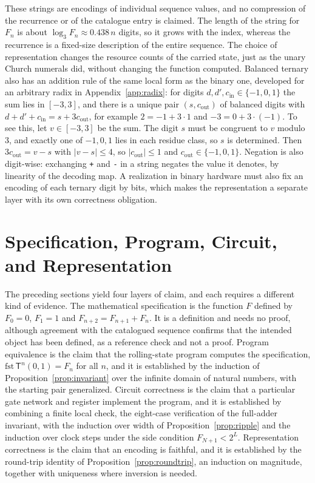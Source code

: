 \documentclass[11pt]{article}
\theoremstyle{definition}
\theoremstyle{remark}
\newcommand{\bt}[1]{\texttt{#1}}
\newcommand{\Tm}{\mathsf{T}}
\begin{document}
These strings are encodings of individual sequence values, and no compression of the recurrence or of the catalogue entry is claimed. The length of the string for $F_n$ is about $\log_3 F_n \approx 0.438\,n$ digits, so it grows with the index, whereas the recurrence is a fixed-size description of the entire sequence. The choice of representation changes the resource counts of the carried state, just as the unary Church numerals did, without changing the function computed. Balanced ternary also has an addition rule of the same local form as the binary one, developed for an arbitrary radix in Appendix~\ref{app:radix}: for digits $d, d', c_{\mathrm{in}} \in \{-1,0,1\}$ the sum lies in $[-3, 3]$, and there is a unique pair $(s, c_{\mathrm{out}})$ of balanced digits with $d + d' + c_{\mathrm{in}} = s + 3c_{\mathrm{out}}$, for example $2 = -1 + 3\cdot 1$ and $-3 = 0 + 3\cdot(-1)$. To see this, let $v \in [-3,3]$ be the sum. The digit $s$ must be congruent to $v$ modulo $3$, and exactly one of $-1, 0, 1$ lies in each residue class, so $s$ is determined. Then $3c_{\mathrm{out}} = v - s$ with $|v - s| \le 4$, so $|c_{\mathrm{out}}| \le 1$ and $c_{\mathrm{out}} \in \{-1, 0, 1\}$. Negation is also digit-wise: exchanging \bt{+} and \bt{-} in a string negates the value it denotes, by linearity of the decoding map. A realization in binary hardware must also fix an encoding of each ternary digit by bits, which makes the representation a separate layer with its own correctness obligation.

\section{Specification, Program, Circuit, and Representation}\label{sec:layers}

The preceding sections yield four layers of claim, and each requires a different kind of evidence. The mathematical specification is the function $F$ defined by $F_0 = 0$, $F_1 = 1$ and $F_{n+2} = F_{n+1} + F_n$. It is a definition and needs no proof, although agreement with the catalogued sequence \cite{oeis} confirms that the intended object has been defined, as a reference check and not a proof. Program equivalence is the claim that the rolling-state program computes the specification, $\mathrm{fst}\,\Tm^{n}(0,1) = F_n$ for all $n$, and it is established by the induction of Proposition~\ref{prop:invariant} over the infinite domain of natural numbers, with the starting pair generalized. Circuit correctness is the claim that a particular gate network and register implement the program, and it is established by combining a finite local check, the eight-case verification of the full-adder invariant, with the induction over width of Proposition~\ref{prop:ripple} and the induction over clock steps under the side condition $F_{N+1} < 2^{L}$. Representation correctness is the claim that an encoding is faithful, and it is established by the round-trip identity of Proposition~\ref{prop:roundtrip}, an induction on magnitude, together with uniqueness where inversion is needed.
\end{document}
